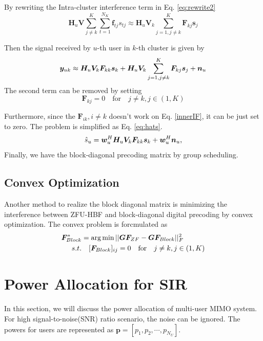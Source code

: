 \documentclass[conference]{IEEEtran}
\def\argmin{\mathop{\mbox{arg\,min}}}
\begin{document}
By rewriting the Intra-cluster interference term in Eq. \eqref{eq:rewrite2}
\begin{equation}
\bm{H}_u \bm{V}\sum_{j\neq k}^K \sum_{t=1}^{N_K} \bm{f}_{tj}{s}_{tj}\approx \bm{H}_{u} \bm{V}_k \sum_{j=1,j\neq k}^{K} \bm{F}_{kj}\bm{s}_j
\end{equation}


Then the signal received by $u$-th user in $k$-th cluster is given by 
\begin{equation}{\label{innerIF}}
{\bm y}_{uk} \approx \bm{H}_u \bm{V}_k \bm{F}_{kk} \bm{s}_{k} + \bm{H}_{u} \bm{V}_k \sum_{j=1,j\neq k}^{K} \bm{F}_{kj}\bm{s}_j + \bm{n}_u
\end{equation}
The second term can be removed by setting 
\begin{equation}
\bm{F}_{kj} =0 \quad \text{for} \quad j \neq k, j\in (1,K)
\end{equation}

Furthermore, since the $\bm{F}_{ik}, i\neq k$ doesn't work on Eq. \eqref{innerIF}, it can be just set to zero. The problem is simplified as Eq. \eqref{eq:hats}.
\begin{equation}{\label{eq:hatblock}}
\hat{s}_u = \bm{w}_u^H \bm{H}_u \bm{V}_k \bm{F}_{kk} \bm{s}_k + \bm{w}_u^H \bm{n}_u,
\end{equation}
Finally, we have the block-diagonal precoding matrix by group scheduling.

\subsection{Convex Optimization}
Another method to realize the block diagonal matrix is minimizing the interference between ZFU-HBF and block-diagonal digital precoding by convex optimization. The convex problem is forcmulated as
\begin{align}
	\bm{F}^*_{Block} &= \argmin ||\bm{GF}_{ZF} - \bm{G} \bm{F}_{Block}||_F^2 \\
	s.t. &\quad [\bm{F}_{Block}]_{ij} =0 \quad \text{for} \quad j \neq k, j\in (1,K) \nonumber
\end{align}

\section{Power Allocation for SIR}
In this section, we will discuss the power allocation of multi-user MIMO system. For high signal-to-noise(SNR) ratio scenario, the noise can be ignored. The powers for users are represented as $\bm{p}=[p_1, p_2, \cdots, p_{N_U}]$. 
\end{document}
